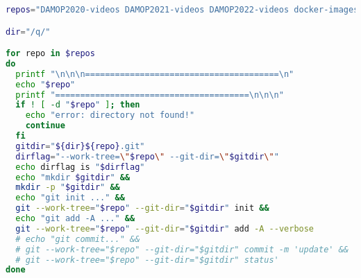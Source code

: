 
\begin{issues}
\issueDraft
\end{issues}

\begin{lstlisting}[language=bash]
repos="DAMOP2020-videos DAMOP2021-videos DAMOP2022-videos docker-images FEDVR-hydrogen FEDVR-TDSE-test Installers pljj 万门课程 数学物理考研试卷 比心 电影 航拍视频 高中电子课本"

dir="/q/"

for repo in $repos
do
  printf "\n\n\n=======================================\n"
  echo "$repo"
  printf "=======================================\n\n\n"
  if ! [ -d "$repo" ]; then
    echo "error: directory not found!"
    continue
  fi
  gitdir="${dir}${repo}.git"
  dirflag="--work-tree=\"$repo\" --git-dir=\"$gitdir\""
  echo dirflag is "$dirflag"
  echo "mkdir $gitdir" &&
  mkdir -p "$gitdir" &&
  echo "git init ..." &&
  git --work-tree="$repo" --git-dir="$gitdir" init &&
  echo "git add -A ..." &&
  git --work-tree="$repo" --git-dir="$gitdir" add -A --verbose
  # echo "git commit..." &&
  # git --work-tree="$repo" --git-dir="$gitdir" commit -m 'update' &&
  # git --work-tree="$repo" --git-dir="$gitdir" status'
done
\end{lstlisting}
